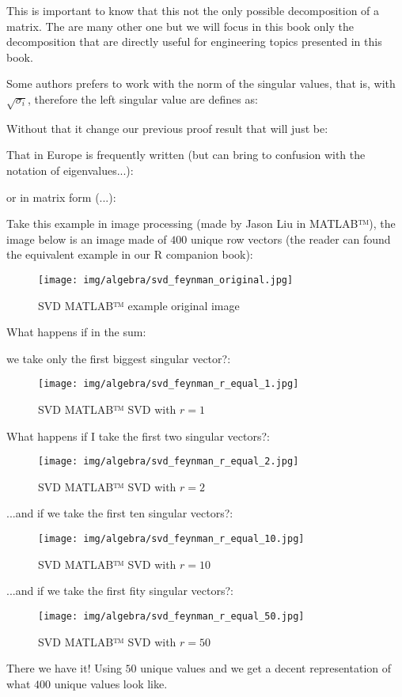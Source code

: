 	This is important to know that this not the only possible decomposition of a matrix. The are many other one but we will focus in this book only the decomposition that are directly useful for engineering topics presented in this book.
	\begin{tcolorbox}[title=Remark,colframe=black,arc=10pt]
	Some authors prefers to work with the norm of the singular values, that is, with $\sqrt{\sigma_i}$, therefore the left singular value are defines as:
	
	Without that it change our previous proof result that will just be:
	
	That in Europe is frequently written (but can bring to confusion with the notation of eigenvalues...):
	
	or in matrix form (...):
	
	\end{tcolorbox}
	
	\pagebreak
	Take this example in image processing (made by Jason Liu in MATLAB™), the image below is an image made of $400$ unique row vectors (the reader can found the equivalent example in our R companion book):
	\begin{figure}[H]
		\centering
		\texttt{[image: img/algebra/svd\_feynman\_original.jpg]}
		\caption{SVD MATLAB™ example original image}
	\end{figure}
	What happens if in the sum:
	
	we take only the first biggest singular vector?:
	\begin{figure}[H]
		\centering
		\texttt{[image: img/algebra/svd\_feynman\_r\_equal\_1.jpg]}
		\caption[]{SVD MATLAB™ SVD with $r=1$}
	\end{figure}
	What happens if I take the first two singular vectors?:
	\begin{figure}[H]
		\centering
		\texttt{[image: img/algebra/svd\_feynman\_r\_equal\_2.jpg]}
		\caption[]{SVD MATLAB™ SVD with $r=2$}
	\end{figure}
	...and if we take the first ten singular vectors?:
	\begin{figure}[H]
		\centering
		\texttt{[image: img/algebra/svd\_feynman\_r\_equal\_10.jpg]}
		\caption[]{SVD MATLAB™ SVD with $r=10$}
	\end{figure}
	...and if we take the first fity singular vectors?:
	\begin{figure}[H]
		\centering
		\texttt{[image: img/algebra/svd\_feynman\_r\_equal\_50.jpg]}
		\caption[]{SVD MATLAB™ SVD with $r=50$}
	\end{figure}
	There we have it! Using $50$ unique values and we get a decent representation of what $400$ unique values look like.
	
